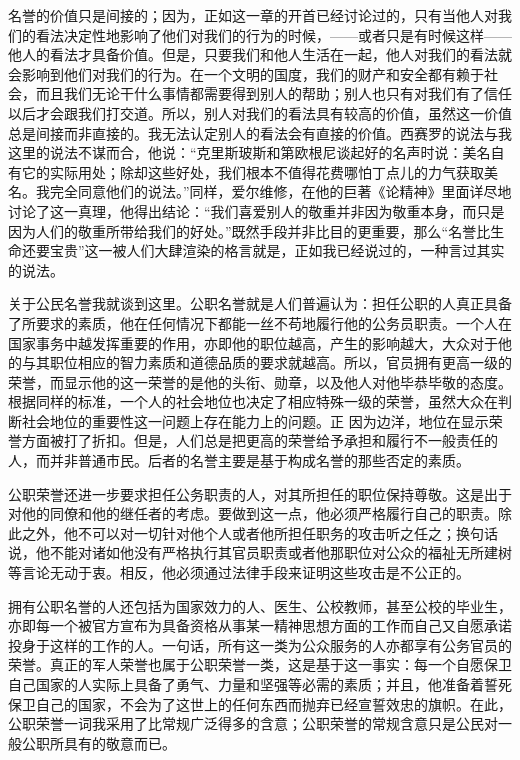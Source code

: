 \documentclass[12pt,oneside]{book}
\begin{document}
名誉的价值只是间接的；因为，正如这一章的开首已经讨论过的，只有当他人对我们的看法决定性地影响了他们对我们的行为的时候，——或者只是有时候这样——他人的看法才具备价值。但是，只要我们和他人生活在一起，他人对我们的看法就会影响到他们对我们的行为。在一个文明的国度，我们的财产和安全都有赖于社会，而且我们无论干什么事情都需要得到别人的帮助；别人也只有对我们有了信任以后才会跟我们打交道。所以，别人对我们的看法具有较高的价值，虽然这一价值总是间接而非直接的。我无法认定别人的看法会有直接的价值。西赛罗的说法与我这里的说法不谋而合，他说：“克里斯玻斯和第欧根尼谈起好的名声时说：美名自有它的实际用处；除却这些好处，我们根本不值得花费哪怕丁点儿的力气获取美名。我完全同意他们的说法。”同样，爱尔维修，在他的巨著《论精神》里面详尽地讨论了这一真理，他得出结论：“我们喜爱别人的敬重并非因为敬重本身，而只是因为人们的敬重所带给我们的好处。”既然手段并非比目的更重要，那么“名誉比生命还要宝贵”这一被人们大肆渲染的格言就是，正如我已经说过的，一种言过其实的说法。 

关于公民名誉我就谈到这里。公职名誉就是人们普遍认为：担任公职的人真正具备了所要求的素质，他在任何情况下都能一丝不苟地履行他的公务员职责。一个人在国家事务中越发挥重要的作用，亦即他的职位越高，产生的影响越大，大众对于他的与其职位相应的智力素质和道德品质的要求就越高。所以，官员拥有更高一级的荣誉，而显示他的这一荣誉的是他的头衔、勋章，以及他人对他毕恭毕敬的态度。根据同样的标准，一个人的社会地位也决定了相应特殊一级的荣誉，虽然大众在判断社会地位的重要性这一问题上存在能力上的问题。正
因为边洋，地位在显示荣誉方面被打了折扣。但是，人们总是把更高的荣誉给予承担和履行不一般责任的人，而并非普通市民。后者的名誉主要是基于构成名誉的那些否定的素质。 

公职荣誉还进一步要求担任公务职责的人，对其所担任的职位保持尊敬。这是出于对他的同僚和他的继任者的考虑。要做到这一点，他必须严格履行自己的职责。除此之外，他不可以对一切针对他个人或者他所担任职务的攻击听之任之；换句话说，他不能对诸如他没有严格执行其官员职责或者他那职位对公众的福祉无所建树等言论无动于衷。相反，他必须通过法律手段来证明这些攻击是不公正的。 

拥有公职名誉的人还包括为国家效力的人、医生、公校教师，甚至公校的毕业生，亦即每一个被官方宣布为具备资格从事某一精神思想方面的工作而自己又自愿承诺投身于这样的工作的人。一句话，所有这一类为公众服务的人亦都享有公务官员的荣誉。真正的军人荣誉也属于公职荣誉一类，这是基于这一事实：每一个自愿保卫自己国家的人实际上具备了勇气、力量和坚强等必需的素质；并且，他准备着誓死保卫自己的国家，不会为了这世上的任何东西而抛弃已经宣誓效忠的旗帜。在此，公职荣誉一词我采用了比常规广泛得多的含意；公职荣誉的常规含意只是公民对一般公职所具有的敬意而已。 
\end{document}
